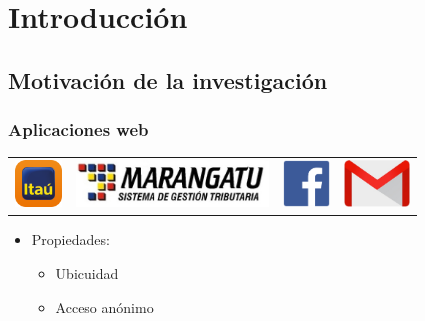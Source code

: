 \section{Introducción}



\subsection{Motivación de la investigación}

\begin{frame}
    \frametitle{Aplicaciones web}

    \begin{flushleft}
        \begin{tabular}{cccc}
            \includegraphics[height=1.25cm]{images/itau-logo.png}
            & \includegraphics[height=1.25cm]{images/marangatu-logo.jpg}
            & \includegraphics[height=1.25cm]{images/facebook-logo.png}
            & \includegraphics[height=1.25cm]{images/gmail-logo.jpg}
        \end{tabular}
    \end{flushleft}

    \begin{itemize}
        \item
        Propiedades:

        \begin{itemize}

            \item
            Ubicuidad %

            \item
            Acceso anónimo


\end{itemize}
\end{itemize}
\end{frame}
